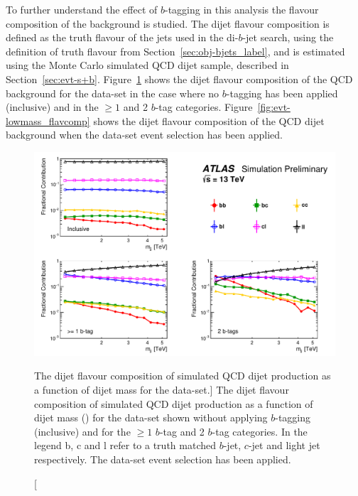 To further understand the effect of $b$-tagging in this analysis the flavour composition of the background is studied.
The dijet flavour composition is defined as the truth flavour of the jets used in the di-$b$-jet search,
using the definition of truth flavour from Section~\ref{sec:obj-bjets_label},
and is estimated using the Monte Carlo simulated QCD dijet sample, described in Section~\ref{sec:evt-s+b}.
Figure~\ref{fig:evt-summer_flavcomp} shows the dijet flavour composition of the QCD background for the
\summer{} data-set in the case where no $b$-tagging
has been applied (inclusive) and in the $\geq1$ and 2 $b$-tag categories.
Figure~\ref{fig:evt-lowmass_flavcomp} shows the dijet flavour composition of the QCD dijet background
when the \lm{} data-set event selection has been applied.

\begin{figure}[!ht]
  \begin{center}
    \includegraphics[width=1.0\linewidth, angle=0]{figs/Dibjet/ICHEP/evt-summer_flavcomp.pdf}
  \end{center}
  \vspace{-1.25em}
  \caption
      [The dijet flavour composition of simulated QCD dijet production as a function of dijet mass for the \summer{} data-set.]
      {The dijet flavour composition of simulated QCD dijet production as a function of dijet mass (\mjj{}) for the \summer{} data-set
        shown without applying $b$-tagging (inclusive) and for the $\geq1$ $b$-tag and 2 $b$-tag categories.
        In the legend b, c and l refer to a truth matched $b$-jet, $c$-jet and light jet respectively.
        The \summer{} data-set event selection has been applied.}
      \label{fig:evt-summer_flavcomp}
\end{figure}

